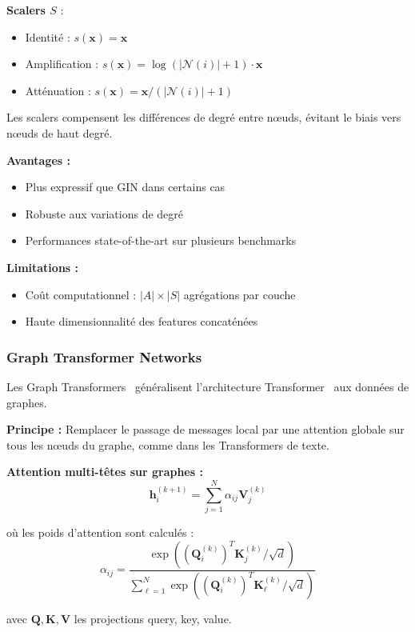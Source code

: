 \textbf{Scalers $S$} :
\begin{itemize}
    \item Identité : $s(\mathbf{x}) = \mathbf{x}$
    \item Amplification : $s(\mathbf{x}) = \log(|\mathcal{N}(i)| + 1) \cdot \mathbf{x}$
    \item Atténuation : $s(\mathbf{x}) = \mathbf{x} / (|\mathcal{N}(i)| + 1)$
\end{itemize}

Les scalers compensent les différences de degré entre nœuds, évitant le biais vers nœuds de haut degré.

\textbf{Avantages :}
\begin{itemize}
    \item Plus expressif que GIN dans certains cas
    \item Robuste aux variations de degré
    \item Performances state-of-the-art sur plusieurs benchmarks
\end{itemize}

\textbf{Limitations :}
\begin{itemize}
    \item Coût computationnel : $|A| \times |S|$ agrégations par couche
    \item Haute dimensionnalité des features concaténées
\end{itemize}

\subsubsection{Graph Transformer Networks}

Les Graph Transformers~\cite{Dwivedi2021,Rampasek2023} généralisent l'architecture Transformer~\cite{Vaswani2017} aux données de graphes.

\textbf{Principe :}
Remplacer le passage de messages local par une attention globale sur tous les nœuds du graphe, comme dans les Transformers de texte.

\textbf{Attention multi-têtes sur graphes :}
\[
\mathbf{h}_i^{(k+1)} = \sum_{j=1}^N \alpha_{ij} \mathbf{V}_j^{(k)}
\]

où les poids d'attention sont calculés :
\[
\alpha_{ij} = \frac{\exp((\mathbf{Q}_i^{(k)})^T \mathbf{K}_j^{(k)} / \sqrt{d})}{\sum_{\ell=1}^N \exp((\mathbf{Q}_i^{(k)})^T \mathbf{K}_\ell^{(k)} / \sqrt{d})}
\]

avec $\mathbf{Q}, \mathbf{K}, \mathbf{V}$ les projections query, key, value.

